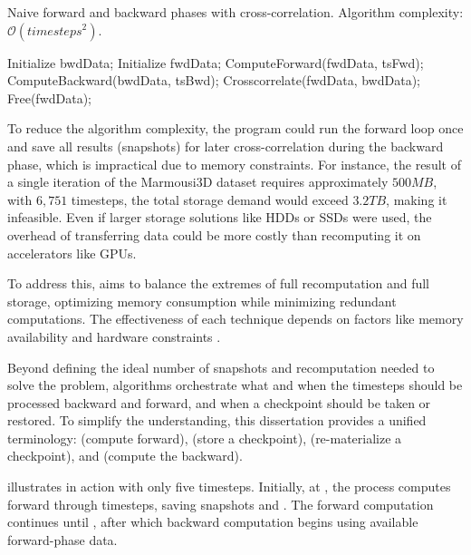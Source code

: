 \documentclass[Ingles]{ic-tese-v3}
\begin{document}
\begin{algorithm}[H]
\caption{Naive forward and backward phases with cross-correlation. Algorithm complexity: $\mathcal{O}(\textit{timesteps}^2)$.}
\label{alg:rtm_naive1}
\begin{algorithmic}[1]  %
\STATE Initialize bwdData;
    \STATE Initialize fwdData;
        \STATE ComputeForward(fwdData, tsFwd);
    \ENDFOR
    \STATE ComputeBackward(bwdData, tsBwd);
    \STATE Crosscorrelate(fwdData, bwdData);
    \State Free(fwdData);
\ENDFOR
\end{algorithmic}
\end{algorithm}

To reduce the algorithm complexity, the program could run the forward loop once and save all results (snapshots) for later cross-correlation during the backward phase, which is impractical due to memory constraints. For instance, the result of a single iteration of the Marmousi3D dataset requires approximately $500MB$, with $6,751$ timesteps, the total storage demand would exceed $3.2TB$, making it infeasible. Even if larger storage solutions like HDDs or SSDs were used, the overhead of transferring data could be more costly than recomputing it on accelerators like GPUs.

To address this, \checkpointing aims to balance the extremes of full recomputation and full storage, optimizing memory consumption while minimizing redundant computations. The effectiveness of each technique depends on factors like memory availability and hardware constraints \cite{symes2007}.

Beyond defining the ideal number of snapshots and recomputation needed to solve the problem, \checkpointing algorithms orchestrate what and when the timesteps should be processed backward and forward, and when a checkpoint should be taken or restored. To simplify the understanding, this dissertation provides a unified terminology: \fwd (compute forward), \save (store a checkpoint), \restore (re-materialize a checkpoint), and \bwd (compute the backward).

 illustrates \checkpointing in action with only five timesteps. Initially, at , the process computes forward through timesteps, saving snapshots  and . The forward computation continues until , after which backward computation begins using available forward-phase data.
\end{document}
